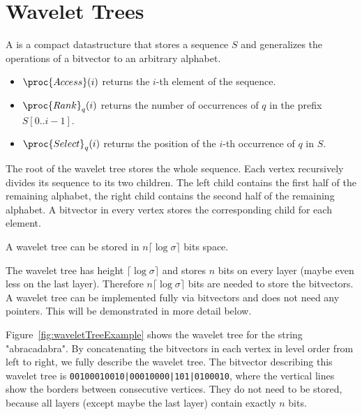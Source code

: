 \section{Wavelet Trees}

\begin{Definition}
  A  is a compact datastructure that stores a sequence $S$ and generalizes the operations of a bitvector to an arbitrary alphabet.
  \begin{itemize}
    \item $\proc{Access}(i)$ returns the $i$-th element of the sequence.
    \item $\proc{Rank}_q(i)$ returns the number of occurrences of $q$ in the prefix $S[0..i-1]$.
    \item $\proc{Select}_q(i)$ returns the position of the $i$-th occurrence of $q$ in $S$.
  \end{itemize}

  The root of the wavelet tree stores the whole sequence. Each vertex recursively divides its sequence to its two children. The left child contains the first half of the remaining alphabet, the right child contains the second half of the remaining alphabet. A bitvector in every vertex stores the corresponding child for each element.
\end{Definition}

\begin{Lemma}
  A wavelet tree can be stored in $n\lceil\log\sigma\rceil$ bits space.
\end{Lemma}

\begin{Proof}
  The wavelet tree has height $\lceil\log\sigma\rceil$ and stores $n$ bits on every layer (maybe even less on the last layer). Therefore $n\lceil\log\sigma\rceil$ bits are needed to store the bitvectors. A wavelet tree can be implemented fully via bitvectors and does not need any pointers. This will be demonstrated in more detail below.
\end{Proof}

\begin{Example}
  \label{exp:waveletTree}
  Figure~\ref{fig:waveletTreeExample} shows the wavelet tree for the string "abracadabra". By concatenating the bitvectors in each vertex in level order from left to right, we fully describe the wavelet tree. The bitvector describing this wavelet tree is \texttt{00100010010|00010000|101|0100010}, where the vertical lines show the borders between consecutive vertices. They do not need to be stored, because all layers (except maybe the last layer) contain exactly $n$ bits.
\end{Example}

